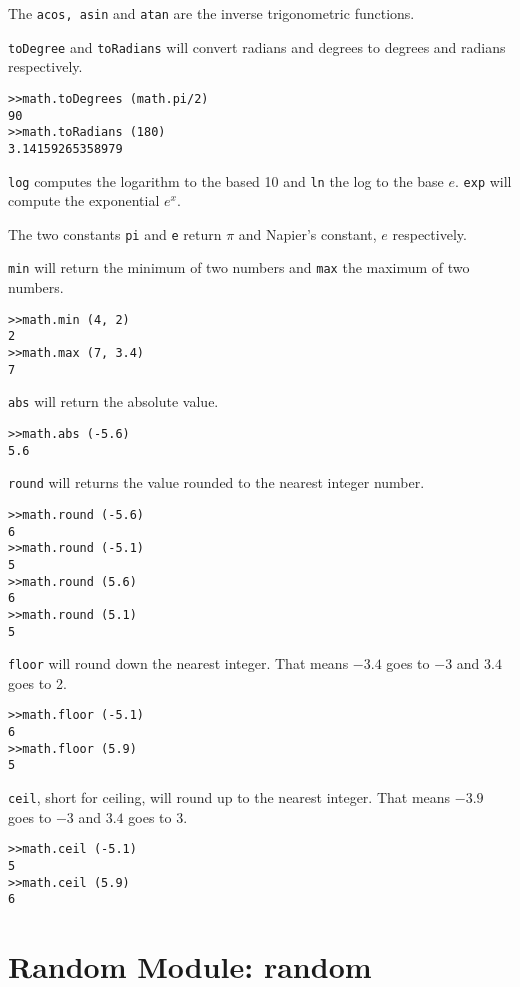 The {\tt acos, asin} and {\tt atan} are the inverse trigonometric functions.

{\tt toDegree} and {\tt toRadians} will convert radians and degrees to degrees and radians respectively.

\begin{lstlisting}
>>math.toDegrees (math.pi/2)
90
>>math.toRadians (180)
3.14159265358979
\end{lstlisting}

{\tt log} computes the logarithm to the based 10 and {\tt ln} the log to the base $e$. {\tt exp} will compute the exponential $e^x$.

The two constants {\tt pi} and {\tt e} return $\pi$ and Napier's constant, $e$ respectively.


{\tt min} will return the minimum of two numbers and {\tt max} the maximum of two numbers.

\begin{lstlisting}
>>math.min (4, 2)
2
>>math.max (7, 3.4)
7
\end{lstlisting}

{\tt abs} will return the absolute value.


\begin{lstlisting}
>>math.abs (-5.6)
5.6
\end{lstlisting}

{\tt round} will returns the value rounded to the nearest integer number.

\begin{lstlisting}
>>math.round (-5.6)
6
>>math.round (-5.1)
5
>>math.round (5.6)
6
>>math.round (5.1)
5
\end{lstlisting}


{\tt floor} will round down the nearest integer. That means $-3.4$ goes to $-3$ and $3.4$ goes to 2.

\begin{lstlisting}
>>math.floor (-5.1)
6
>>math.floor (5.9)
5
\end{lstlisting}

{\tt ceil}, short for ceiling, will round up to the nearest integer. That means $-3.9$ goes to $-3$ and $3.4$ goes to 3.

\begin{lstlisting}
>>math.ceil (-5.1)
5
>>math.ceil (5.9)
6
\end{lstlisting}


\section{Random Module: random}

